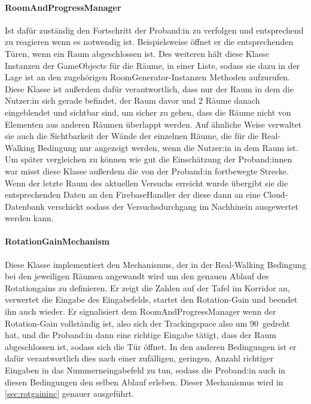 \begin{multicols*}{2}
    \paragraph{RoomAndProgressManager}
    Ist dafür zuständig den Fortschritt der Proband:in zu verfolgen und entsprechend zu reagieren wenn es notwendig ist. Beispielsweise öffnet er die entsprechenden Türen, wenn ein Raum abgeschlossen ist.
    Des weiteren hält diese Klasse Instanzen der GameObjects für die Räume, in einer Liste, sodass sie dazu in der Lage ist an den zugehörigen RoomGenerator-Instanzen Methoden aufzurufen. Diese Klasse ist außerdem dafür verantwortlich, dass nur der Raum in dem die Nutzer:in sich gerade befindet, der Raum davor und 2 Räume danach eingeblendet und sichtbar sind, um sicher zu gehen, dass die Räume nicht von Elementen aus anderen Räumen überlappt werden. Auf ähnliche Weise verwaltet sie auch die Sichtbarkeit der Wände der einzelnen Räume, die für die Real-Walking Bedingung nur angezeigt werden, wenn die Nutzer:in in dem Raum ist.
    Um später vergleichen zu können wie gut die Einschätzung der Proband:innen war misst diese Klasse außerdem die von der Proband:in fortbewegte Strecke. Wenn der letzte Raum des aktuellen Versuchs erreicht wurde übergibt sie die entsprechenden Daten an den FirebaseHandler der diese dann an eine Cloud-Datenbank verschickt sodass der Versuchsdurchgang im Nachhinein ausgewertet werden kann.

    \paragraph{RotationGainMechanism}

    Diese Klasse implementiert den Mechanismus, der in der Real-Walking Bedingung bei den jeweiligen Räumen angewandt wird um den genauen Ablauf des Rotationgains zu definieren. Er zeigt die Zahlen auf der Tafel im Korridor an, verwertet die Eingabe des Eingabefelds, startet den Rotation-Gain und beendet ihn auch wieder. Er signalisiert dem RoomAndProgressManager wenn der Rotation-Gain vollständig ist, also sich der Trackingspace also um
    90\textdegree\
    gedreht hat, und die Proband:in dann eine richtige Eingabe tätigt, dass der Raum abgeschlossen ist, sodass sich die Tür öffnet. In den anderen Bedingungen ist er dafür verantwortlich dies nach einer zufälligen, geringen, Anzahl richtiger Eingaben in das Nummerneingabefeld zu tun, sodass die Proband:in auch in diesen Bedingungen den selben Ablauf erleben. Dieser Mechanismus wird in \autoref{sec:rotgaininc} genauer ausgeführt.


\end{multicols*}
